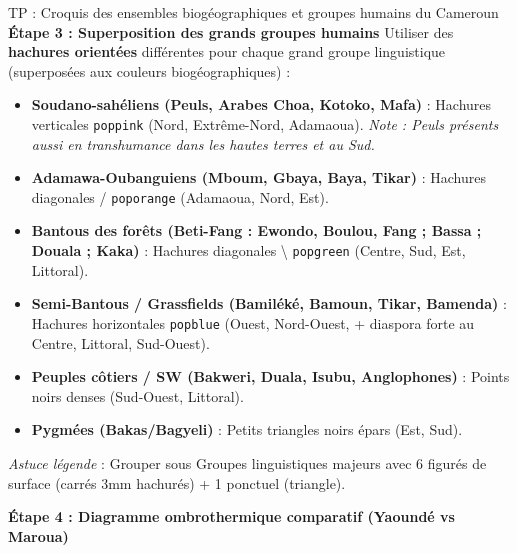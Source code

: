 \documentclass[11pt]{article}
\begin{document}
\begin{exoresolu}{TP : Croquis des ensembles biogéographiques et groupes humains du Cameroun}
\textbf{Étape 3 : Superposition des grands groupes humains}
Utiliser des \textbf{hachures orientées} différentes pour chaque grand groupe linguistique (superposées aux couleurs biogéographiques) :
\begin{itemize}
    \item \textbf{Soudano-sahéliens (Peuls, Arabes Choa, Kotoko, Mafa)} : Hachures verticales \texttt{poppink} (Nord, Extrême-Nord, Adamaoua). \emph{Note : Peuls présents aussi en transhumance dans les hautes terres et au Sud.}
    \item \textbf{Adamawa-Oubanguiens (Mboum, Gbaya, Baya, Tikar)} : Hachures diagonales \og / \fg{} \texttt{poporange} (Adamaoua, Nord, Est).
    \item \textbf{Bantous des forêts (Beti-Fang : Ewondo, Boulou, Fang ; Bassa ; Douala ; Kaka)} : Hachures diagonales \og \textbackslash \fg{} \texttt{popgreen} (Centre, Sud, Est, Littoral).
    \item \textbf{Semi-Bantous / Grassfields (Bamiléké, Bamoun, Tikar, Bamenda)} : Hachures horizontales \texttt{popblue} (Ouest, Nord-Ouest, + diaspora forte au Centre, Littoral, Sud-Ouest).
    \item \textbf{Peuples côtiers / SW (Bakweri, Duala, Isubu, Anglophones)} : Points noirs denses (Sud-Ouest, Littoral).
    \item \textbf{Pygmées (Bakas/Bagyeli)} : Petits triangles noirs épars (Est, Sud).
\end{itemize}
\emph{Astuce légende} : Grouper sous \og Groupes linguistiques majeurs \fg{} avec 6 figurés de surface (carrés 3mm hachurés) + 1 ponctuel (triangle).

\textbf{Étape 4 : Diagramme ombrothermique comparatif (Yaoundé vs Maroua)}
\begin{center}
\end{center}
\end{exoresolu}
\end{document}
